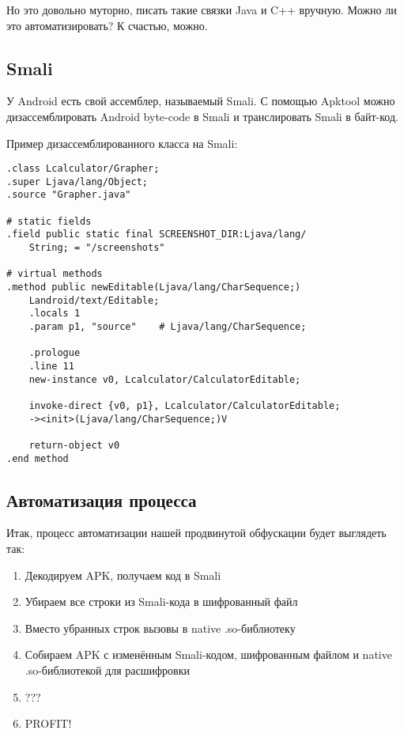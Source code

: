 \documentclass[10pt, a5paper]{article}
\begin{document}
Но это довольно муторно, писать такие связки Java и C++ вручную. Можно ли это автоматизировать? К счастью, можно.

\subsection*{Smali}

У Android есть свой ассемблер, называемый Smali. С помощью Apktool можно дизассемблировать Android byte-code в Smali и транслировать Smali в байт-код.

Пример дизассемблированного класса на Smali:

\begin{verbatim}
.class Lcalculator/Grapher;
.super Ljava/lang/Object;
.source "Grapher.java"

# static fields
.field public static final SCREENSHOT_DIR:Ljava/lang/
	String; = "/screenshots"

# virtual methods
.method public newEditable(Ljava/lang/CharSequence;)
	Landroid/text/Editable;
    .locals 1
    .param p1, "source"    # Ljava/lang/CharSequence;

    .prologue
    .line 11
    new-instance v0, Lcalculator/CalculatorEditable;

    invoke-direct {v0, p1}, Lcalculator/CalculatorEditable;
	-><init>(Ljava/lang/CharSequence;)V

    return-object v0
.end method
\end{verbatim}

\subsection*{Автоматизация процесса}

Итак, процесс автоматизации нашей продвинутой обфускации будет выглядеть так:

\begin{enumerate}
  \item Декодируем APK, получаем код в Smali
  \item Убираем все строки из Smali-кода в шифрованный файл
  \item Вместо убранных строк вызовы в native .so-библиотеку
  \item Собираем APK с изменённым Smali-кодом, шифрованным файлом и native .so-библиотекой для расшифровки
  \item ???
  \item PROFIT!
\end{enumerate}
\end{document}
